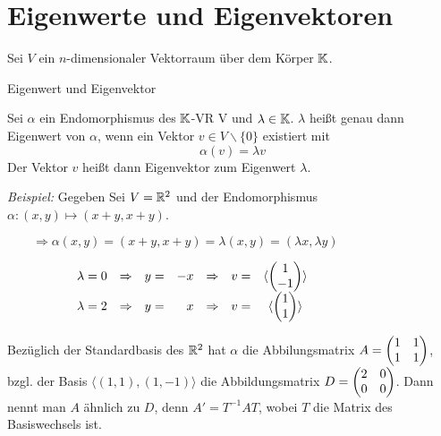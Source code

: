 \section{Eigenwerte und Eigenvektoren}

Sei $V$ ein $n$-dimensionaler Vektorraum über dem Körper $\mathbb{K}$.


\begin{mydef} Eigenwert und Eigenvektor \par
    Sei $\alpha$ ein Endomorphismus des $\mathbb{K}$-VR V und $\lambda\in \mathbb{K}$. $\lambda$ heißt genau dann Eigenwert von $\alpha$, wenn ein Vektor $v\in 
    V\backslash\lbrace0\rbrace$ existiert mit
    \begin{equation*}
        \alpha(v) = \lambda v
    \end{equation*}
    Der Vektor $v$ heißt dann Eigenvektor zum Eigenwert $\lambda$.
\end{mydef}


\textit{Beispiel:}
    Gegeben Sei $V=\mathbb{R}^2$ und der Endomorphismus $\alpha:(x,y)\mapsto (x+y,x+y)$. \par
    $\qquad \Rightarrow \alpha(x,y)=(x+y,x+y) = \lambda(x,y)=(\lambda x,\lambda y)$ \par
    $\begin{array}{ccccrccc}
        \qquad\qquad &\lambda=0 & \Rightarrow & y= & -x & \Rightarrow & v= &\langle \left(\begin{matrix}1\\-1\end{matrix}\right) \rangle \\
        \qquad\qquad &\lambda=2 & \Rightarrow & y= &  x & \Rightarrow & v= &\langle \left(\begin{matrix}1\\ 1\end{matrix}\right) \rangle
    \end{array}$ \par
    Bezüglich der Standardbasis des $\mathbb{R}^2$ hat $\alpha$ die Abbilungsmatrix $A=\left(\begin{matrix}1&1\\1&1\end{matrix}\right)$, bzgl. der Basis $\langle(1,1),(1,-1)\rangle$ die 
    Abbildungsmatrix $D=\left(\begin{matrix}2&0\\0&0\end{matrix}\right)$. Dann nennt man $A$ ähnlich zu $D$, denn $A'=T^{-1}AT$, wobei $T$ die Matrix des Basiswechsels ist.

